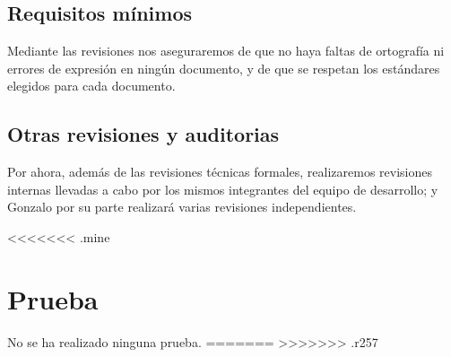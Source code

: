 \documentclass[spanish,a4paper,11pt, twoside]{report}	%
\begin{document}
	\section{Requisitos mínimos}
	Mediante las revisiones nos aseguraremos de que no haya faltas de ortografía ni errores de expresión en ningún documento, y de que se respetan los estándares elegidos para cada documento.
	\section{Otras revisiones y auditorias}
	Por ahora, además de las revisiones técnicas formales, realizaremos revisiones internas llevadas a cabo por los mismos integrantes del  equipo de desarrollo;  y Gonzalo por su parte realizará varias revisiones independientes.

\newpage
\mbox{}
\thispagestyle{empty}						%
\newpage  

<<<<<<< .mine
\chapter{ Prueba}%
	No se ha realizado ninguna prueba.
=======
>>>>>>> .r257

\end{document}
